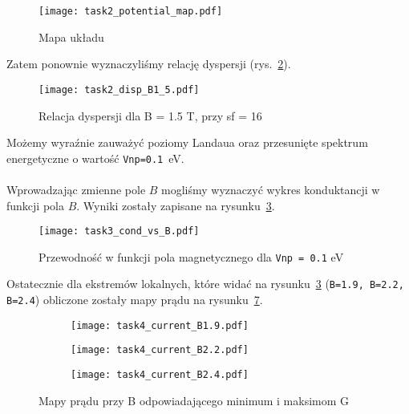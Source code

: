 \documentclass{article}
\begin{document}
\begin{figure}
    \centering
    \texttt{[image: task2\_potential\_map.pdf]}
    \caption{Mapa układu}
    \label{fig:task2-map}
\end{figure}
Zatem ponownie wyznaczyliśmy relację dyspersji (rys.~\ref{fig:task2-B}).
\begin{figure}
    \centering
    \texttt{[image: task2\_disp\_B1\_5.pdf]}
    \caption{Relacja dyspersji dla B = 1.5 T, przy sf = 16}
    \label{fig:task2-B}
\end{figure}
Możemy wyraźnie zauważyć poziomy Landaua oraz przesunięte spektrum energetyczne o wartość \texttt{Vnp=0.1}~eV.\\
\\
Wprowadzając zmienne pole $B$ mogliśmy wyznaczyć wykres konduktancji w funkcji pola $B$.
Wyniki zostały zapisane na rysunku~\ref{fig:task3-cond}.
\begin{figure}
    \centering
    \texttt{[image: task3\_cond\_vs\_B.pdf]}
    \caption{Przewodność w funkcji pola magnetycznego dla \texttt{Vnp = 0.1} eV}
    \label{fig:task3-cond}
\end{figure}
Ostatecznie dla ekstremów lokalnych, które widać na rysunku~\ref{fig:task3-cond} (\texttt{B=1.9, B=2.2, B=2.4}) obliczone zostały mapy prądu na rysunku~\ref{fig:task4-Bs}.
\begin{figure}
    \centering
\begin{subfigure}{.495\textwidth}
\texttt{[image: task4\_current\_B1.9.pdf]}
    \caption{}
    \label{fig:task4-B1}
\end{subfigure}
\begin{subfigure}{.495\textwidth}
\texttt{[image: task4\_current\_B2.2.pdf]}
    \caption{}
    \label{fig:task4-B2}
\end{subfigure}
\begin{subfigure}{.495\textwidth}
\texttt{[image: task4\_current\_B2.4.pdf]}
    \caption{}
    \label{fig:task4-B3}
\end{subfigure}
\caption{Mapy prądu przy B odpowiadającego minimum i maksimom G}
\label{fig:task4-Bs}
\end{figure}
\end{document}
